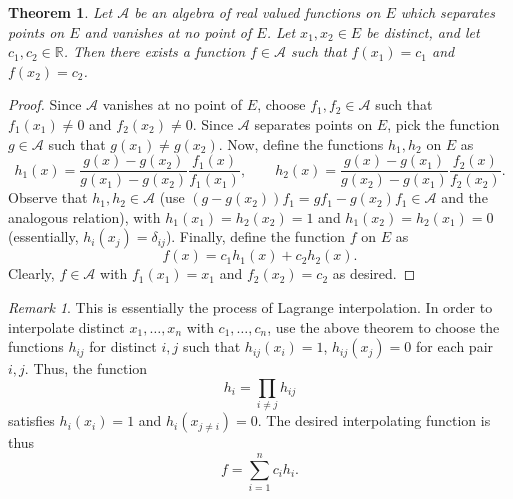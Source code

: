 \documentclass[11pt]{article}
\def\R{\mathbb{R}}
\newtheorem{theorem}{Theorem}[section]
\theoremstyle{definition}
\theoremstyle{remark}
\newtheorem*{remark}{Remark}
\begin{document}
    \begin{theorem} \label{theo:interpolate}
        Let $\mathscr{A}$ be an algebra of real valued functions on $E$ which
        separates points on $E$ and vanishes at no point of $E$. Let $x_1, x_2 \in E$ be
        distinct, and let $c_1, c_2 \in \R$. Then there exists a function $f \in
        \mathscr{A}$ such that $f(x_1) = c_1$ and $f(x_2) = c_2$.
    \end{theorem}
    \begin{proof}
        Since $\mathscr{A}$ vanishes at no point of $E$, choose $f_1, f_2 \in
        \mathscr{A}$ such that $f_1(x_1) \neq 0$ and $f_2(x_2) \neq 0$.  Since
        $\mathscr{A}$ separates points on $E$, pick the function $g \in \mathscr{A}$
        such that $g(x_1) \neq g(x_2)$. Now, define the functions $h_1, h_2$ on $E$
        as \[
            h_1(x) = \frac{g(x) - g(x_2)}{g(x_1) - g(x_2)}\frac{f_1(x)}{f_1(x_1)}, \qquad 
            h_2(x) = \frac{g(x) - g(x_1)}{g(x_2) - g(x_1)}\frac{f_2(x)}{f_2(x_2)}.
        \] Observe that $h_1, h_2 \in \mathscr{A}$ (use $(g - g(x_2))f_1 = gf_1 -
        g(x_2)f_1 \in \mathscr{A}$ and the analogous relation), with $h_1(x_1) =
        h_2(x_2) = 1$ and $h_1(x_2) = h_2(x_1) = 0$ (essentially, $h_{i}(x_j) =
        \delta_{ij}$).  Finally, define the function $f$ on $E$ as \[
            f(x) = c_1 h_1(x) + c_2 h_2(x).
        \] Clearly, $f \in \mathscr{A}$ with $f_1(x_1) = x_1$ and $f_2(x_2) = c_2$ as
        desired.
    \end{proof}
    \begin{remark}
        This is essentially the process of Lagrange interpolation. In order to
        interpolate distinct $x_1, \dots, x_n$ with $c_1, \dots, c_n$, use the above
        theorem to choose the functions $h_{ij}$ for distinct $i, j$ such that
        $h_{ij}(x_i) = 1$, $h_{ij}(x_j) = 0$ for each pair $i, j$. Thus, the function
        \[
            h_i = \prod_{i \neq j} h_{ij}
        \] satisfies $h_i(x_i) = 1$ and $h_i(x_{j \neq i}) = 0$. The desired
        interpolating function is thus \[
            f = \sum_{i = 1}^n c_ih_i.
        \] 
    \end{remark}
\end{document}
